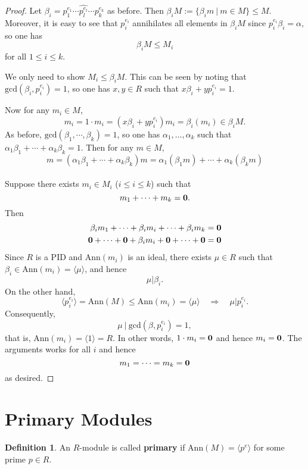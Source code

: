 \documentclass[11pt,openany]{book}
\theoremstyle{plain}
\theoremstyle{definition}
\newtheorem{definition}[definition]{Definition}
\theoremstyle{remark}
\begin{document}
\begin{proof}
    Let $\beta_i=p_1^{e_1}\cdots \widehat{p_l^{e_l}}\cdots p_k^{e_k}$ as before.
    Then $\beta_{i}M:=\{\beta_{i}m\ |\ m\in M\}\leq M$. Moreover, it is easy to see that $p_i^{e_i}$ annihilates all elements in $\beta_iM$ since $p_i^{e_i}\beta_i = \alpha$, so one has
    $$\beta_i M\leq M_i$$
    for all $1 \leq i \leq k.$

    \medskip
    \noindent{} We only need to show $M_i \leq \beta_iM$. This can be seen by noting that $\mathrm{gcd}(\beta_i,p_i^{e_i})=1$, so one has $x, y \in R$ such that $x\beta_i+yp_i^{e_i}=1$.
        
    Now for any $m_i\in M$, 
    $$m_i= 1\cdot m_i = (x\beta_i+yp_i^{e_i})m_i=\beta_i(m_i)\in \beta_i M.$$
     As before, $\mathrm{gcd}(\beta_1,\cdots ,\beta_k)=1$, so one has $\alpha_1, \dots, \alpha_k$ such that $\alpha_1\beta_1+\cdots+\alpha_k\beta_k=1$. Then for any $m\in M$,
    $$m=(\alpha_1\beta_1+\cdots+\alpha_k\beta_k)m= \alpha_1(\beta_1m)+\cdots+\alpha_k(\beta_km)$$\\
     Suppose there exists  $m_i \in M_i$ ($i \leq i \leq k$) such that
    $$m_1 + \dots + m_k = {\bf 0}.$$
    Then 
    \begin{align*}
          \beta_im_1 + \dots + \beta_im_i + \dots + \beta_im_k &= {\bf 0}\\
            {\bf 0}+ \dots + {\bf 0} + \beta_i m_i + {\bf 0} + \dots + {\bf 0} &= {\bf 0}
        \end{align*}
        Since $R$ is a PID and $\mathrm{Ann}(m_i)$ is an ideal, there exists $\mu \in R$ such that $\beta_i \in \mathrm{Ann}(m_i) = \langle \mu \rangle$, and hence 
        $$\mu | \beta_i.$$ 
        On the other hand, 
        $$\langle p_i^{e_i} \rangle = \mathrm{Ann}(M) \leq \mathrm{Ann}(m_i) = \langle \mu \rangle  \quad \Rightarrow \quad \mu | p_i^{e_i}.$$
        Consequently, $$\mu\ |\ \mathrm{gcd}(\beta,p_i^{e_i}) = 1,$$
        that is, $\mathrm{Ann}(m_i) = \langle 1 \rangle = R$. In other words, $1\cdot m_i = {\bf 0}$ and hence $m_i = {\bf 0}$. The arguments works for all $i$ and hence 
        $$m_1 = \dots = m_k = {\bf 0}$$
        as desired.
\end{proof}

\section{Primary Modules}
\begin{definition}
    An $R$-module is called {\bf primary} if $\mathrm{Ann}(M)=\langle p^e\rangle$ for some prime $p\in R$.
\end{definition}
\end{document}
